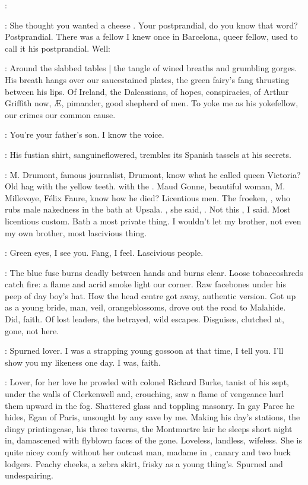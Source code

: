 \waitress:

\kevin:
She thought you wanted a cheese .
Your postprandial, do you know that word?
Postprandial.
There was a fellow I knew once in Barcelona, queer fellow,
used to call it his postprandial.
Well:

\StephenInt:
Around the slabbed tables |
the tangle of wined breaths and grumbling gorges.
His breath hangs over our saucestained plates,
the green fairy's fang thrusting between his lips.
Of Ireland, the Dalcassians,
of hopes, conspiracies,
of Arthur Griffith now,
Æ,
pimander, good shepherd of men.
To yoke me as his yokefellow,
our crimes our common cause.

\kevin:
You're your father's son.
I know the voice.

\StephenInt:
His fustian shirt, sanguineflowered,
trembles its Spanish tassels at his secrets.

\kevin:
M. Drumont, famous journalist, Drumont,
know what he called queen Victoria?
Old hag with the yellow teeth.
 with the .
Maud Gonne, beautiful woman,
M. Millevoye,
Félix Faure, know how he died?
Licentious men.
The froeken, ,
who rubs male nakedness in the bath at Upsala.
, she said, .
Not this , I said.
Most licentious custom.
Bath a most private thing.
I wouldn't let my brother, not even my own brother,
most lascivious thing.

\StephenInt:
Green eyes, I see you.
Fang, I feel.
Lascivious people.

\StephenInt:
The blue fuse burns deadly between hands and burns clear.
Loose tobaccoshreds catch fire:
a flame and acrid smoke light our corner.
Raw facebones under his peep of day boy's hat.
How the head centre got away,
authentic version.
Got up as a young bride,
man, veil, orangeblossoms,
drove out the road to Malahide.
Did, faith.
Of lost leaders, the betrayed, wild escapes.
Disguises, clutched at, gone, not here.

\kevin:
Spurned lover.
I was a strapping young gossoon at that time, I tell you.
I'll show you my likeness one day.
I was, faith.

\StephenInt:
Lover,
for her love
he prowled with colonel Richard Burke,
tanist of his sept,
under the walls of Clerkenwell
and, crouching,
saw a flame of vengeance hurl them upward in the fog.
Shattered glass and toppling masonry.
In gay Paree he hides,
Egan of Paris,
unsought by any save by me.
Making his day's stations,
the dingy printingcase,
his three taverns,
the Montmartre lair he sleeps short night in,
damascened with flyblown faces of the gone.
Loveless, landless, wifeless.
She is quite nicey comfy without her outcast man,
madame in ,
canary and two buck lodgers.
Peachy cheeks, a zebra skirt, frisky as a young thing's.
Spurned and undespairing.

